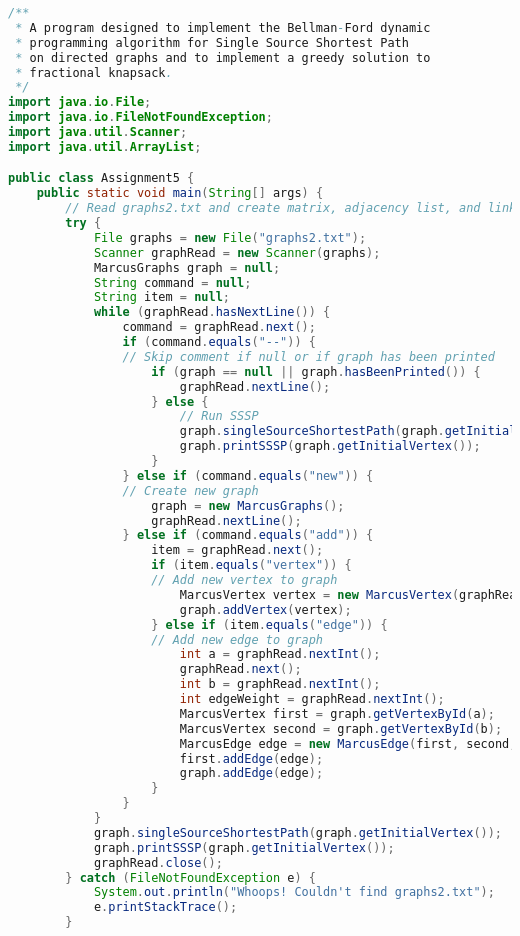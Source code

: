 \documentclass[letterpaper, 10pt]{article}
\begin{document}
\vspace{5.0em}

\begin{lstlisting}[language=Java]
/**
 * A program designed to implement the Bellman-Ford dynamic
 * programming algorithm for Single Source Shortest Path
 * on directed graphs and to implement a greedy solution to
 * fractional knapsack.
 */
import java.io.File;
import java.io.FileNotFoundException;
import java.util.Scanner;
import java.util.ArrayList;

public class Assignment5 {
    public static void main(String[] args) {
        // Read graphs2.txt and create matrix, adjacency list, and linked objects
        try {
            File graphs = new File("graphs2.txt");
            Scanner graphRead = new Scanner(graphs);
            MarcusGraphs graph = null;
            String command = null;
            String item = null;
            while (graphRead.hasNextLine()) {
                command = graphRead.next();
                if (command.equals("--")) {
                // Skip comment if null or if graph has been printed
                    if (graph == null || graph.hasBeenPrinted()) {
                        graphRead.nextLine();
                    } else {
                        // Run SSSP
                        graph.singleSourceShortestPath(graph.getInitialVertex());
                        graph.printSSSP(graph.getInitialVertex());
                    }
                } else if (command.equals("new")) {
                // Create new graph
                    graph = new MarcusGraphs();
                    graphRead.nextLine();
                } else if (command.equals("add")) {
                    item = graphRead.next();
                    if (item.equals("vertex")) {
                    // Add new vertex to graph
                        MarcusVertex vertex = new MarcusVertex(graphRead.nextInt());
                        graph.addVertex(vertex);
                    } else if (item.equals("edge")) {
                    // Add new edge to graph
                        int a = graphRead.nextInt();
                        graphRead.next();
                        int b = graphRead.nextInt();
                        int edgeWeight = graphRead.nextInt();
                        MarcusVertex first = graph.getVertexById(a);
                        MarcusVertex second = graph.getVertexById(b);
                        MarcusEdge edge = new MarcusEdge(first, second, edgeWeight);
                        first.addEdge(edge);
                        graph.addEdge(edge);
                    }
                }
            }
            graph.singleSourceShortestPath(graph.getInitialVertex());
            graph.printSSSP(graph.getInitialVertex());
            graphRead.close();
        } catch (FileNotFoundException e) {
            System.out.println("Whoops! Couldn't find graphs2.txt");
            e.printStackTrace();
        }


\end{lstlisting}
\end{document}
